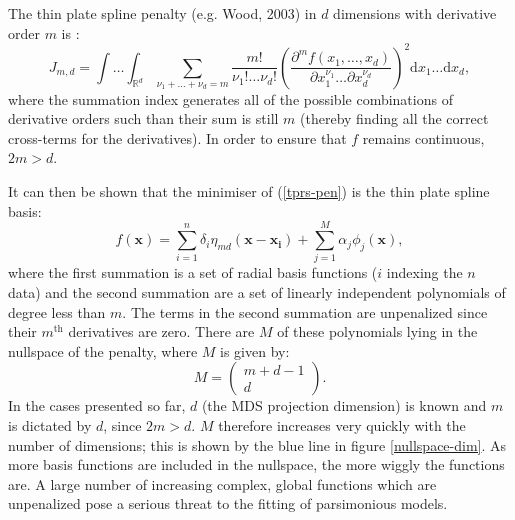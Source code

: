 \documentclass[useAMS,referee, usegraphicx]{biom}
\begin{document}
The thin plate spline penalty (e.g. Wood, 2003) in $d$ dimensions with derivative order $m$ is :
\begin{equation}
J_{m,d} = \int \ldots \int_{\mathbb{R}^d} \sum_{\nu_1 + \dots + \nu_d=m} \frac{m!}{\nu_1! \dots \nu_d!} \left( \frac{\partial^m f \left (x_1,\dots,x_d \right )}{\partial x_1^{\nu_1} \ldots  \partial x_d^{\nu_d}} \right)^2 \text{d} x_1 \ldots  \text{d} x_d,
\label{tprs-pen}
\end{equation}
where the summation index generates all of the possible combinations of derivative orders such than their sum is still $m$ (thereby finding all the correct cross-terms for the derivatives). In order to ensure that $f$ remains continuous, $2m>d$.

It can then be shown that the minimiser of (\ref{tprs-pen}) is the thin plate spline basis:
\begin{equation}
f(\mathbf{x}) = \sum_{i=1}^n \delta_i \eta_{md}(\mathbf{x}-\mathbf{x_i}) + \sum_{j=1}^M \alpha_j \phi_j(\mathbf{x}),
\label{tprs-basis}
\end{equation}
where the first summation is a set of radial basis functions ($i$ indexing the $n$ data) and the second summation are a set of linearly independent polynomials of degree less than $m$. The terms in the second summation are unpenalized since their $m^\text{th}$ derivatives are zero. There are $M$ of these polynomials lying in the nullspace of the penalty, where $M$ is given by:
\begin{equation}
M=\begin{pmatrix} m+d-1 \\ d  \end{pmatrix}.
\label{gds-bigm}
\end{equation}
In the cases presented so far, $d$ (the MDS projection dimension) is known and $m$ is dictated by $d$, since $2m>d$. $M$ therefore increases very quickly with the number of dimensions; this is shown by the blue line in figure \ref{nullspace-dim}. As more basis functions are included in the nullspace, the more wiggly the functions are. A large number of increasing complex, global functions which are unpenalized pose a serious threat to the fitting of parsimonious models.
\end{document}
